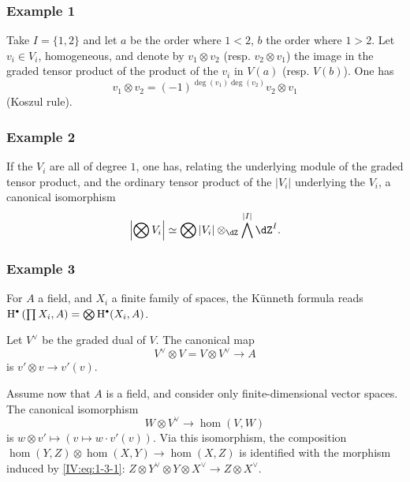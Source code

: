 \subsubsection*{Example 1}

Take $I=\{1,2\}$ and let $a$ be the order where $1<2$, $b$ the order where $1>2$.
Let $v_i\in V_i$, homogeneous, and denote by $v_1\otimes v_2$ (resp.
$v_2\otimes v_1$) the image in the graded tensor product of the product of the
$v_i$ in $V(a)$ (resp. $V(b)$). One has
\[
  v_1\otimes v_2 = (-1)^{\deg(v_1)\deg(v_2)} v_2\otimes v_1
\]
(Koszul rule).




\subsubsection*{Example 2}

If the $V_i$ are all of degree $1$, one has, relating the underlying module of the
graded tensor product, and the ordinary tensor product of the
$|V_i|$ underlying the $V_i$, a canonical isomorphism
\[
  \left|\bigotimes V_i\right| \simeq \bigotimes |V_i|\otimes_{\dZ}\bigwedge^{|I|}\dZ^I \text{.}
\]




\subsubsection*{Example 3}

For $A$ a field, and $X_i$ a finite family of spaces, the
K\"unneth formula reads
$\h^\bullet\left(\prod X_i,A\right) = \bigotimes \h^\bullet(X_i,A)$.

Let $V^\vee$ be the graded dual of $V$. The canonical map
\begin{equation*}\tag{1.3.1}\label{IV:eq:1-3-1}
  V^\vee\otimes V = V\otimes V^\vee \to A
\end{equation*}
is $v'\otimes v\to v'(v)$.

Assume now that $A$ is a field, and consider only
finite-dimensional vector spaces. The canonical isomorphism
\begin{equation*}\tag{1.3.2}\label{IV:eq:1-3-2}
  W\otimes V^\vee \to \hom(V,W)
\end{equation*}
is $w\otimes v'\mapsto \left(v\mapsto w\cdot v'(v)\right)$. Via this
isomorphism, the composition $\hom(Y,Z)\otimes \hom(X,Y)\to \hom(X,Z)$
is identified with the morphism induced by \eqref{IV:eq:1-3-1}:
$Z\otimes Y^\vee\otimes Y\otimes X^\vee \to Z\otimes X^\vee$.

